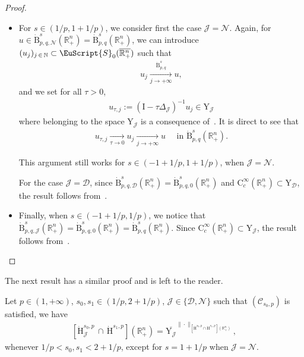 \documentclass[10pt]{amsart}
\theoremstyle{definition}\newtheorem{defi}[theo]{Definition}\newtheorem{rema}[theo]{Remark}\newtheorem{exam}[theo]{Example}\newtheorem{exem}[theo]{Example}\newtheorem{nota}[theo]{Notation}
\newcommand{\bbR}{\mathbb{R}}
\newcommand{\bbN}{\mathbb{N}}
\newcommand{\rmH}{\mathrm{H}}%
\newcommand{\rmB}{\mathrm{B}}
\newcommand{\rmC}{\mathrm{C}}
\newcommand{\rmI}{\mathrm{I}}
\newcommand{\rmY}{\mathrm{Y}}
\newcommand{\clC}{\mathcal{C}}
\newcommand{\clN}{\mathcal{N}}
\newcommand{\clJ}{\mathcal{J}}
\newcommand{\clD}{\mathcal{D}}
\newcommand{\eus}{\EuScript}
\begin{document}
\begin{proof}
\begin{itemize}
\begin{align*}
\left\| u - u_{j,\lambda} \right\|_{\dot{\rmB}^{s}_{p,q}\left(\bbR^n_+\right)}\leqslant \left\| u - u_j \right\|_{\dot{\rmB}^{s}_{p,q}\left(\bbR^n_+\right)} + \left\| u_j - u_{j,\lambda} \right\|_{\dot{\rmB}^{s}_{p,q}\left(\bbR^n_+\right)}<2\varepsilon.
\end{align*}
This concludes the case $s\in(1+1/p,2+1/p)$.

\item For $s\in (1/p,1+1/p)$, we consider first the case $\clJ=\clN$. Again, for $u\in\dot{\rmB}^{s}_{p,q,\clN}(\bbR^n_+)=\dot{\rmB}^{s}_{p,q}(\bbR^n_+)$, we can introduce $(u_j)_{j\,\in\,\bbN } \subset \eus{S}_0(\overline{\bbR^n_+})$ such that
\begin{align*}
u_j \xrightarrow[j\rightarrow +\infty]{\dot{\rmB}^{s}_{p,q}} u,
\end{align*}
and we set for all $\tau>0$,
\begin{align*}
u_{\tau,j}:= (\rmI -\tau\Delta_{\clJ})^{-1}u_j \in \rmY_{\clJ}
\end{align*}
where belonging to the space $\rmY_{\clJ}$ is a consequence of~\cite[Propositions~5.4~\&~5.6]{Gaudin2022}. It is direct to see that
\begin{align*}
u_{\tau,j}\xrightarrow[\tau\rightarrow 0]{} u_{j}\xrightarrow[j\rightarrow +\infty]{} u \quad \text{ in } \dot{\rmB}^{s}_{p,q}(\bbR^n_+).
\end{align*}

This argument still works for $s\in(-1+1/p,1+1/p)$, when $\clJ=\clN$.

For the case $\clJ=\clD$, since $\dot{\rmB}^{s}_{p,q,\clD}(\bbR^n_+)=\dot{\rmB}^{s}_{p,q,0}(\bbR^n_+)$ and $\rmC _c^\infty(\bbR^n_+) \subset \rmY_{\mathcal{\clD}}$, the result follows from~\cite[Lemma~3.16]{Gaudin2022}.

\item Finally, when $s\in (-1+1/p,1/p)$, we notice that $\dot{\rmB}^{s}_{p,q,\clJ}(\bbR^n_+)=\dot{\rmB}^{s}_{p,q,0}(\bbR^n_+)=\dot{\rmB}^{s}_{p,q}(\bbR^n_+)$. Since $\rmC _c^\infty(\bbR^n_+) \subset \rmY_{\mathcal{\clJ}}$, the result follows from~\cite[Corollary~3.18]{Gaudin2022}.\qedhere
\end{itemize}
\end{proof}


The next result has a similar proof and is left to the reader.

\begin{prop}\label{prop:DensityResultHomNeum\^IntersecSobol}
Let $p\in(1,+\infty)$, $s_0,s_1\in(1/p,2+1/p)$, $\clJ\in\{\clD,\clN\}$ such that $(\clC_{s_0,p})$ is satisfied, we have
\begin{align*}
\left[\dot{\rmH}^{s_0,p}_{\clJ}\,\cap\,{\dot{\rmH}^{s_1,p}}\right]\left(\bbR^n_+\right) = \overline{\rmY_{\clJ}}^{\|\cdot\|_{\left[\dot{\rmH}^{s_0,p}\cap{\dot{\rmH}^{s_1,p}}\right]\left(\bbR^n_+\right)}},
\end{align*}
whenever $1/p<s_0,s_1<2+1/p$, except for $s=1+1/p$ when $\clJ=\clN$.
\end{prop}
\end{document}
